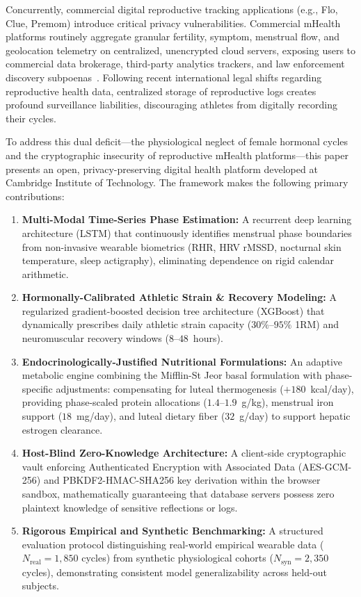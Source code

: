 \documentclass[conference]{IEEEtran}
\begin{document}
Concurrently, commercial digital reproductive tracking applications (e.g., Flo, Clue, Premom) introduce critical privacy vulnerabilities. Commercial mHealth platforms routinely aggregate granular fertility, symptom, menstrual flow, and geolocation telemetry on centralized, unencrypted cloud servers, exposing users to commercial data brokerage, third-party analytics trackers, and law enforcement discovery subpoenas~\cite{mozilla2023}. Following recent international legal shifts regarding reproductive health data, centralized storage of reproductive logs creates profound surveillance liabilities, discouraging athletes from digitally recording their cycles.

To address this dual deficit---the physiological neglect of female hormonal cycles and the cryptographic insecurity of reproductive mHealth platforms---this paper presents an open, privacy-preserving digital health platform developed at Cambridge Institute of Technology. The framework makes the following primary contributions:
\begin{enumerate}
    \item \textbf{Multi-Modal Time-Series Phase Estimation:} A recurrent deep learning architecture (LSTM) that continuously identifies menstrual phase boundaries from non-invasive wearable biometrics (RHR, HRV rMSSD, nocturnal skin temperature, sleep actigraphy), eliminating dependence on rigid calendar arithmetic.
    \item \textbf{Hormonally-Calibrated Athletic Strain \& Recovery Modeling:} A regularized gradient-boosted decision tree architecture (XGBoost) that dynamically prescribes daily athletic strain capacity ($30\%$--$95\%$ 1RM) and neuromuscular recovery windows ($8$--$48$~hours).
    \item \textbf{Endocrinologically-Justified Nutritional Formulations:} An adaptive metabolic engine combining the Mifflin-St Jeor basal formulation with phase-specific adjustments: compensating for luteal thermogenesis ($+180$~kcal/day), providing phase-scaled protein allocations ($1.4$--$1.9$~g/kg), menstrual iron support ($18$~mg/day), and luteal dietary fiber ($32$~g/day) to support hepatic estrogen clearance.
    \item \textbf{Host-Blind Zero-Knowledge Architecture:} A client-side cryptographic vault enforcing Authenticated Encryption with Associated Data (AES-GCM-256) and PBKDF2-HMAC-SHA256 key derivation within the browser sandbox, mathematically guaranteeing that database servers possess zero plaintext knowledge of sensitive reflections or logs.
    \item \textbf{Rigorous Empirical and Synthetic Benchmarking:} A structured evaluation protocol distinguishing real-world empirical wearable data ($N_{\text{real}} = 1{,}850$ cycles) from synthetic physiological cohorts ($N_{\text{syn}} = 2{,}350$ cycles), demonstrating consistent model generalizability across held-out subjects.
\end{enumerate}
\end{document}
